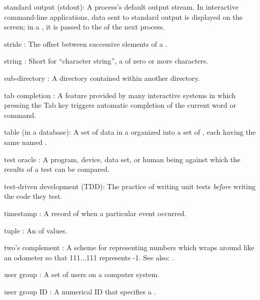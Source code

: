 \documentclass{book}
\begin{document}
\begin{swcdescription}
\item[standard output] (stdout):
A process's default output stream. In
interactive command-line applications, data sent to standard output is
displayed on the screen; in a , it is passed to
the  of the next process.

\item[stride]:
The offset between successive elements of a
.

\item[string]:
Short for ``character string'', a
 of zero or more characters.

\item[sub-directory]:
A directory contained within another directory.

\item[tab completion]:
A feature provided by many interactive systems
in which pressing the Tab key triggers automatic completion of the
current word or command.

\item[table] (in a database):
A set of data in a
 organized into a
set of , each having the same named
.

\item[test oracle]:
A program, device, data set, or human being
against which the results of a test can be compared.

\item[test-driven development] (TDD):
The practice of writing unit
tests \emph{before} writing the code they test.
 
\item[timestamp]:
A record of when a particular event occurred.

\item[tuple]:
An 
 of values.
 
\item[two's complement]:
A scheme for representing numbers which wraps around like an odometer
so that 111...111 represents -1.
See also: .
 
\item[user group]:
A set of users on a computer system.
 
\item[user group ID]:
A numerical ID that specifies a .
 

\end{swcdescription}
\end{document}

